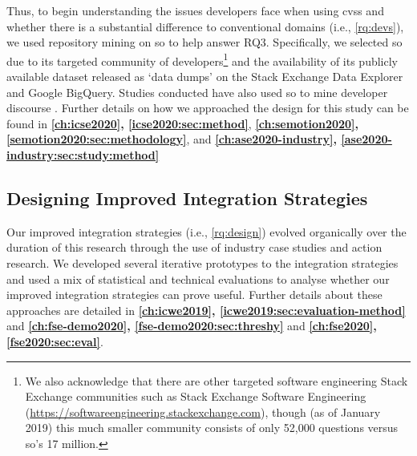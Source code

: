 Thus, to begin understanding the issues developers face when using \glspl{cvs} and whether there is a substantial difference to conventional domains (i.e., \ref{rq:devs}), we used repository mining on \gls{so} to help answer RQ3. Specifically, we selected \gls{so} due to its targeted community of developers\footnote{We also acknowledge that there are other targeted software engineering Stack Exchange communities such as Stack Exchange Software Engineering (\url{https://softwareengineering.stackexchange.com}), though (as of January 2019) this much smaller community consists of only 52,000 questions versus \gls{so}'s 17 million.} and the availability of its publicly available dataset released as `data dumps' on the Stack Exchange Data Explorer and Google BigQuery. Studies conducted have also used \gls{so} to mine developer discourse \citep{Choi:2015wo,Sinha:2013tt,Novielli:2015vda,Rosen:2016uk,Pal:2012te,Bajaj:2014wg,LinaresVasquez:2014vj,Wang:2013ue,Barua:2012gz,Reboucas:2016tw,Allamanis:2013is,Tahir:2018ks}.
Further details on how we approached the design for this study can be found in \textbf{\cref{ch:icse2020}, \cref{icse2020:sec:method}}, \textbf{\cref{ch:semotion2020}, \cref{semotion2020:sec:methodology}}, and \textbf{\cref{ch:ase2020-industry}, \cref{ase2020-industry:sec:study:method}}

\subsection{Designing Improved Integration Strategies}

Our improved integration strategies (i.e., \ref{rq:design}) evolved organically over the duration of this research through the use of industry case studies and action research. We developed several iterative prototypes to the integration strategies and used a mix of statistical and technical evaluations to analyse whether our improved integration strategies can prove useful. Further details about these approaches are detailed in \textbf{\cref{ch:icwe2019}, \cref{icwe2019:sec:evaluation-method}} and \textbf{\cref{ch:fse-demo2020}, \cref{fse-demo2020:sec:threshy}} and \textbf{\cref{ch:fse2020}, \cref{fse2020:sec:eval}}.
